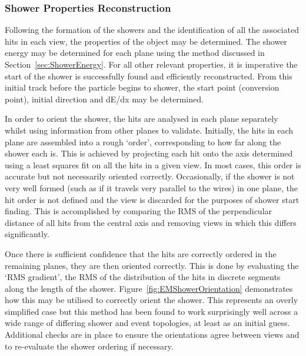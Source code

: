 \subsubsection{Shower Properties Reconstruction}\label{sec:EMShowerProperties}

Following the formation of the showers and the identification of all the associated hits in each view, the properties of the object may be determined.  The shower energy may be determined for each plane using the method discussed in Section~\ref{sec:ShowerEnergy}.  For all other relevant properties, it is imperative the start of the shower is successfully found and efficiently reconstructed.  From this initial track before the particle begins to shower, the start point (conversion point), initial direction and dE/dx may be determined.

In order to orient the shower, the hits are analysed in each plane separately whilst using information from other planes to validate.  Initially, the hits in each plane are assembled into a rough `order', corresponding to how far along the shower each is.  This is achieved by projecting each hit onto the axis determined using a least squares fit on all the hits in a given view.  In most cases, this order is accurate but not necessarily oriented correctly.  Occasionally, if the shower is not very well formed (such as if it travels very parallel to the wires) in one plane, the hit order is not defined and the view is discarded for the purposes of shower start finding.  This is accomplished by comparing the RMS of the perpendicular distance of all hits from the central axis and removing views in which this differs significantly.

Once there is sufficient confidence that the hits are correctly ordered in the remaining planes, they are then oriented correctly.  This is done by evaluating the `RMS gradient', the RMS of the distribution of the hits in discrete segments along the length of the shower.  Figure~\ref{fig:EMShowerOrientation} demonstrates how this may be utilised to correctly orient the shower.  This represents an overly simplified case but this method has been found to work surprisingly well across a wide range of differing shower and event topologies, at least as an initial guess.  Additional checks are in place to ensure the orientations agree between views and to re-evaluate the shower ordering if necessary.

